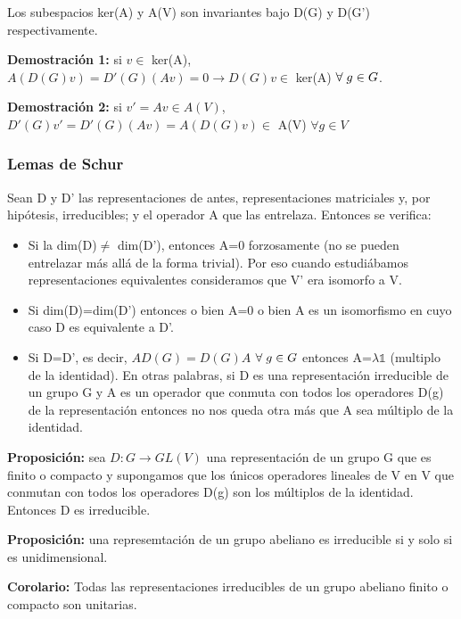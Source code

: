Los subespacios ker(A) y A(V) son invariantes bajo D(G) y D(G') respectivamente.

\smallskip
\textbf{Demostración 1:} si $v\in$ ker(A), $A(D(G)v)=D'(G)(Av)=0\longrightarrow D(G)v\in$ ker(A) $\forall  \hspace{0.1cm} g\in G$.

\smallskip
\textbf{Demostración 2:} si $v'=Av\in A(V)$, $D'(G)v'=D'(G)(Av)=A(D(G)v)\in$ A(V) $\forall g\in V$

\subsubsection{Lemas de Schur}

Sean D y D' las representaciones de antes, representaciones matriciales y, por hipótesis, irreducibles; y el operador A que las entrelaza. Entonces se verifica:

\begin{itemize}
\item Si la dim(D)$\neq$ dim(D'), entonces A=0 forzosamente (no se pueden entrelazar más allá de la forma trivial). Por eso cuando estudiábamos representaciones equivalentes consideramos que V' era isomorfo a V.

\item Si dim(D)=dim(D') entonces o bien A=0 o bien A es un isomorfismo en cuyo caso D es equivalente a D'.
\item Si D=D', es decir, $AD(G)=D(G)A$ $\forall  \hspace{0.1cm} g\in G$ entonces A=$\lambda \mathds{1}$ (multiplo de la identidad). En otras palabras, si D es una representación irreducible de un grupo G y A es un operador que conmuta con todos los operadores D(g) de la representación entonces no nos queda otra más que A sea múltiplo de la identidad.
\end{itemize}

\smallskip

\textbf{Proposición:} sea $D: G\to GL(V)$ una representación de un grupo G que es finito o compacto y supongamos que los únicos operadores lineales de V en V que conmutan con todos los operadores D(g) son los múltiplos de la identidad. Entonces D es irreducible.

\smallskip
\textbf{Proposición:} una represemtación de un grupo abeliano es irreducible si y solo si es unidimensional.

\smallskip
\textbf{Corolario:} Todas las representaciones irreducibles de un grupo abeliano finito o compacto son unitarias.

